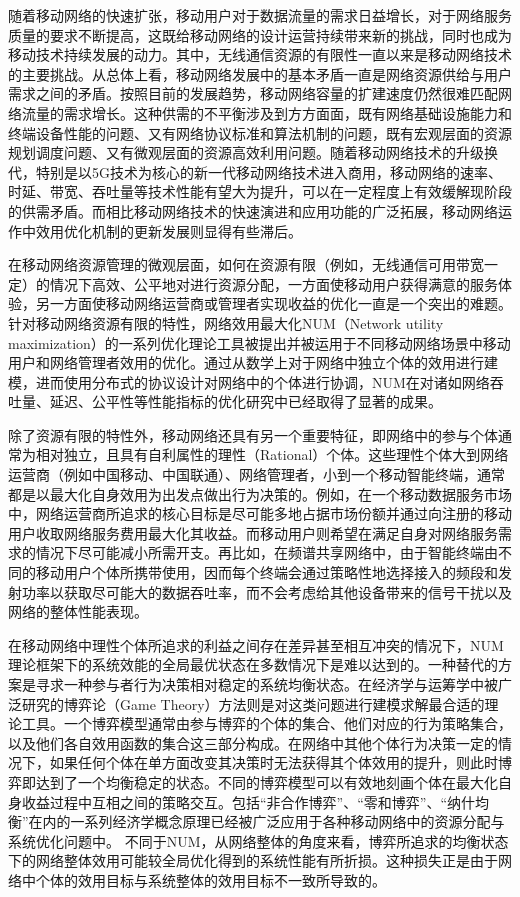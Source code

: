 随着移动网络的快速扩张，移动用户对于数据流量的需求日益增长，对于网络服务质量的要求不断提高，这既给移动网络的设计运营持续带来新的挑战，同时也成为移动技术持续发展的动力。其中，无线通信资源的有限性一直以来是移动网络技术的主要挑战。从总体上看，移动网络发展中的基本矛盾一直是网络资源供给与用户需求之间的矛盾。按照目前的发展趋势，移动网络容量的扩建速度仍然很难匹配网络流量的需求增长。这种供需的不平衡涉及到方方面面，既有网络基础设施能力和终端设备性能的问题、又有网络协议标准和算法机制的问题，既有宏观层面的资源规划调度问题、又有微观层面的资源高效利用问题。随着移动网络技术的升级换代，特别是以5G技术为核心的新一代移动网络技术进入商用，移动网络的速率、时延、带宽、吞吐量等技术性能有望大为提升，可以在一定程度上有效缓解现阶段的供需矛盾。而相比移动网络技术的快速演进和应用功能的广泛拓展，移动网络运作中效用优化机制的更新发展则显得有些滞后。

在移动网络资源管理的微观层面，如何在资源有限（例如，无线通信可用带宽一定）的情况下高效、公平地对进行资源分配，一方面使移动用户获得满意的服务体验，另一方面使移动网络运营商或管理者实现收益的优化一直是一个突出的难题。针对移动网络资源有限的特性，网络效用最大化NUM（Network utility maximization）的一系列优化理论工具被提出并被运用于不同移动网络场景中移动用户和网络管理者效用的优化。通过从数学上对于网络中独立个体的效用进行建模，进而使用分布式的协议设计对网络中的个体进行协调，NUM在对诸如网络吞吐量、延迟、公平性等性能指标的优化研究中已经取得了显著的成果\cite{NET}。

除了资源有限的特性外，移动网络还具有另一个重要特征，即网络中的参与个体通常为相对独立，且具有自利属性的理性（Rational）个体。这些理性个体大到网络运营商（例如中国移动、中国联通）、网络管理者，小到一个移动智能终端，通常都是以最大化自身效用为出发点做出行为决策的。例如，在一个移动数据服务市场中，网络运营商所追求的核心目标是尽可能多地占据市场份额并通过向注册的移动用户收取网络服务费用最大化其收益。而移动用户则希望在满足自身对网络服务需求的情况下尽可能减小所需开支。再比如，在频谱共享网络中，由于智能终端由不同的移动用户个体所携带使用，因而每个终端会通过策略性地选择接入的频段和发射功率以获取尽可能大的数据吞吐率，而不会考虑给其他设备带来的信号干扰以及网络的整体性能表现。

在移动网络中理性个体所追求的利益之间存在差异甚至相互冲突的情况下，NUM理论框架下的系统效能的全局最优状态在多数情况下是难以达到的。一种替代的方案是寻求一种参与者行为决策相对稳定的系统均衡状态。在经济学与运筹学中被广泛研究的博弈论（Game Theory）方法则是对这类问题进行建模求解最合适的理论工具。一个博弈模型通常由参与博弈的个体的集合、他们对应的行为策略集合，以及他们各自效用函数的集合这三部分构成。在网络中其他个体行为决策一定的情况下，如果任何个体在单方面改变其决策时无法获得其个体效用的提升，则此时博弈即达到了一个均衡稳定的状态。不同的博弈模型可以有效地刻画个体在最大化自身收益过程中互相之间的策略交互。包括“非合作博弈”、“零和博弈”、“纳什均衡”在内的一系列经济学概念原理\cite{osborne}已经被广泛应用于各种移动网络中的资源分配与系统优化问题中\cite{han2012game}。
不同于NUM，从网络整体的角度来看，博弈所追求的均衡状态下的网络整体效用可能较全局优化得到的系统性能有所折损。这种损失正是由于网络中个体的效用目标与系统整体的效用目标不一致所导致的。

